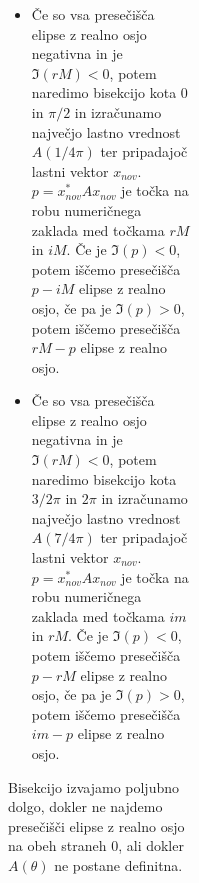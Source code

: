 \documentclass[12pt,a4paper]{amsart}\usepackage[slovene]{babel}%
\theoremstyle{definition}\newtheorem{definicija}{Definicija}[section]\newtheorem{primer}[definicija]{Primer}\newtheorem{opomba}[definicija]{Opomba}
\theoremstyle{plain}\newtheorem{lema}[definicija]{Lema}\newtheorem{izrek}[definicija]{Izrek}\newtheorem{trditev}[definicija]{Trditev}\newtheorem{posledica}[definicija]{Posledica}
\begin{document}
{\begin{figure}[H]
\begin{figure}[H]
\begin{figure}[H]
\begin{figure}[H]
\begin{itemize}
\item Če so vsa presečišča elipse z realno osjo negativna in je $\Im (rM) <0$, potem naredimo bisekcijo kota $0$ in $\pi /2$ in izračunamo največjo lastno vrednost $A(1/4 \pi)$ ter pripadajoč lastni vektor $x_{nov}$. $p = x_{nov}^\ast A x_{nov}$ je točka na robu numeričnega zaklada med točkama $rM$ in $iM$. Če je $\Im (p) <0$, potem iščemo presečišča $p-iM$ elipse z realno osjo, če pa je $\Im (p) >0$, potem iščemo presečišča $rM-p$ elipse z realno osjo.
\item Če so vsa presečišča elipse z realno osjo negativna in je $\Im (rM) <0$, potem naredimo bisekcijo kota $3/2 \pi$ in $2\pi$ in izračunamo največjo lastno vrednost $A(7/4 \pi)$ ter pripadajoč lastni vektor $x_{nov}$. $p = x_{nov}^\ast A x_{nov}$ je točka na robu numeričnega zaklada med točkama $im$ in $rM$. Če je $\Im (p) <0$, potem iščemo presečišča $p-rM$ elipse z realno osjo, če pa je $\Im (p) >0$, potem iščemo presečišča $im-p$ elipse z realno osjo.
\end{itemize}
Bisekcijo izvajamo poljubno dolgo, dokler ne najdemo presečišči elipse z realno osjo na obeh straneh 0, ali dokler $A(\theta)$ ne postane definitna.

\end{figure}
\end{figure}
\end{figure}
\end{figure}}
\end{document}
